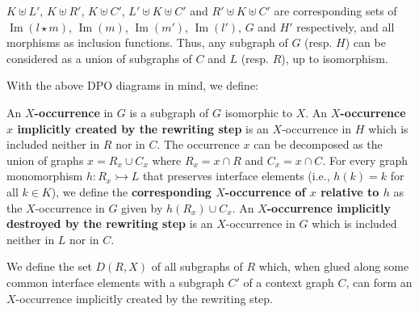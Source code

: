         $K \uplus L'$, 
         $K \uplus R'$, 
         $K \uplus C'$, 
         $L' \uplus K \uplus C'$ and 
         $R' \uplus K \uplus C'$ 
            are corresponding sets of 
         $\operatorname{Im}(l \star m)$, 
         $\operatorname{Im}(m)$, 
         $\operatorname{Im}(m')$,
         $\operatorname{Im}(l')$,
         $G$ and
         $H'$ respectively,
         and all morphisms as inclusion functions.
    Thus, any subgraph of $G$ (resp. $H$) can be considered as a union of subgraphs of $C$ and $L$ (resp. $R$), up to isomorphism.

With the above DPO diagrams in mind, we define:

\begin{definition}
    \label{def:corresponding_occurrence}
     An \textbf{$X$-occurrence} in $G$ is a subgraph of $G$ isomorphic to $X$. An \textbf{$X$-occurrence $x$ implicitly created by the rewriting step} is an \( X \)-occurrence in $H$ which is included neither in \( R \) nor in $C$. 
      The occurrence $x$ can be decomposed as the union of graphs $x = R_x \cup C_x$ where $R_x = x \cap R$ and $C_x = x \cap C$. For every graph monomorphism $h : R_x \rightarrowtail L$ that preserves interface elements (i.e., \( h(k) = k \) for all \( k \in K \)), we define the \textbf{corresponding $X$-occurrence of $x$ relative to $h$} as the $X$-occurrence in $G$ given by $h(R_x) \cup C_x$.
    An \textbf{$X$-occurrence implicitly destroyed by the rewriting step} is an \( X \)-occurrence in $G$ which is included neither in \( L \) nor in $C$.
\end{definition}
We define the set \(D(R,X)\) of all subgraphs of \( R \) which, when glued along some common interface elements with a subgraph $C'$ of a context graph \( C \), can form an \( X \)-occurrence implicitly created by the rewriting step.

